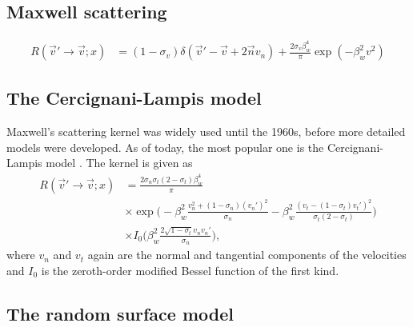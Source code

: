 \subsection{Maxwell scattering}
\begin{align}
	R(\vec v'\rightarrow \vec v; x) &= (1-\sigma_v)\delta(\vec v' - \vec v + 2\vec nv_n) + \frac{2\sigma_v\beta_w^4}{\pi}\exp(-\beta_w^2v^2)
\end{align}

\subsection{The Cercignani-Lampis model}
Maxwell's scattering kernel was widely used until the 1960s, before more detailed models were developed. As of today, the most popular one is the Cercignani-Lampis model \cite{book:micro_and_nano}. The kernel is given as
\begin{align}
	\nonumber
	R(\vec v'\rightarrow \vec v; x) &= \frac{2\sigma_n\sigma_t(2-\sigma_t)\beta_w^4}{\pi}\\
	\nonumber
	&\times\exp\Big(-\beta_w^2\frac{v_n^2 + (1-\sigma_n)(v_n')^2}{\sigma_n} - \beta_w^2\frac{(v_t - (1 - \sigma_t)v_t')^2}{\sigma_t(2 - \sigma_t)}\Big)\\
	&\times I_0\Big(\beta_w^2\frac{2\sqrt{1 - \sigma_t}v_nv_n'}{\sigma_n}\Big),
\end{align}
where $v_n$ and $v_t$ again are the normal and tangential components of the velocities and $I_0$ is the zeroth-order modified Bessel function of the first kind. 

\subsection{The random surface model}